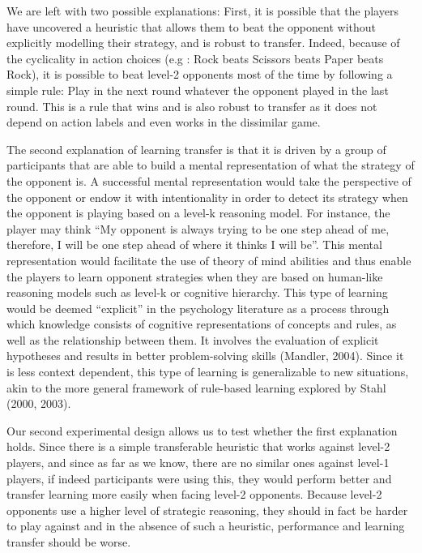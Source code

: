 \documentclass[man,floatsintext]{apa6}
\begin{document}
We are left with two possible explanations: First, it is possible that the players have uncovered a heuristic that allows them to beat the opponent without explicitly modelling their strategy, and is robust to transfer. Indeed, because of the cyclicality in action choices (e.g : Rock beats Scissors beats Paper beats Rock), it is possible to beat level-2 opponents most of the time by following a simple rule: Play in the next round whatever the opponent played in the last round. This is a rule that wins and is also robust to transfer as it does not depend on action labels and even works in the dissimilar game.

The second explanation of learning transfer is that it is driven by a group of participants that are able to build a mental representation of what the strategy of the opponent is. A successful mental representation would take the perspective of the opponent or endow it with intentionality in order to detect its strategy when the opponent is playing based on a level-k reasoning model. For instance, the player may think \enquote{My opponent is always trying to be one step ahead of me, therefore, I will be one step ahead of where it thinks I will be}. This mental representation would facilitate the use of theory of mind abilities and thus enable the players to learn opponent strategies when they are based on human-like reasoning models such as level-k or cognitive hierarchy. This type of learning would be deemed \enquote{explicit} in the psychology literature as a process through which knowledge consists of cognitive representations of concepts and rules, as well as the relationship between them. It involves the evaluation of explicit hypotheses and results in better problem-solving skills (Mandler, 2004). Since it is less context dependent, this type of learning is generalizable to new situations, akin to the more general framework of rule-based learning explored by Stahl (2000, 2003).

Our second experimental design allows us to test whether the first explanation holds. Since there is a simple transferable heuristic that works against level-2 players, and since as far as we know, there are no similar ones against level-1 players, if indeed participants were using this, they would perform better and transfer learning more easily when facing level-2 opponents. Because level-2 opponents use a higher level of strategic reasoning, they should in fact be harder to play against and in the absence of such a heuristic, performance and learning transfer should be worse.
\end{document}
